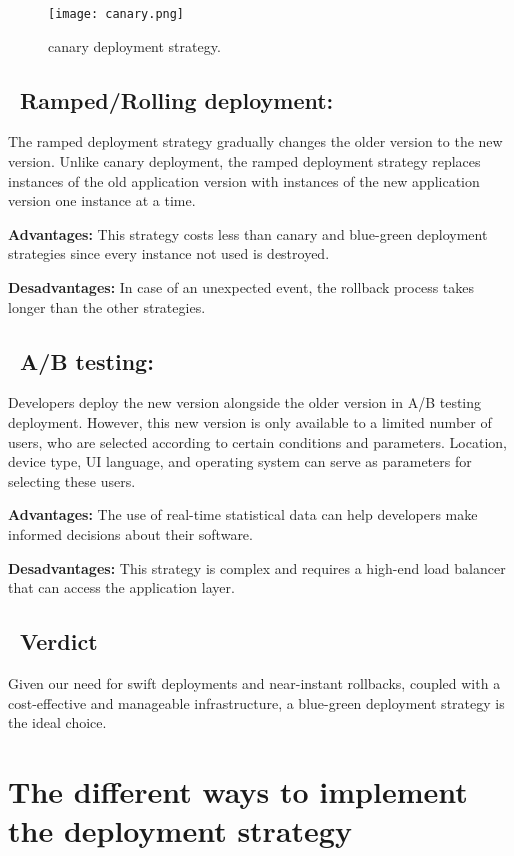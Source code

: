 \begin{figure}[htbp]
    \centering
    \texttt{[image: canary.png]}
    \caption{canary deployment strategy.}
    \label{fig:canary-deployment-strategy}
\end{figure}

\subsection*{ \textbullet\ Ramped/Rolling deployment:}
The ramped deployment strategy gradually changes the older version to the new version. Unlike canary deployment, the ramped deployment strategy replaces instances of the old application version with instances of the new application version one instance at a time.
\par \noindent \textbf{Advantages:} This strategy costs less than canary and blue-green deployment strategies since every instance not used is destroyed.
\par \noindent \textbf{Desadvantages:} In case of an unexpected event, the rollback process takes longer than the other strategies.

\subsection*{ \textbullet\ A/B testing:}
Developers deploy the new version alongside the older version in A/B testing deployment. However, this new version is only available to a limited number of users, who are selected according to certain conditions and parameters. Location, device type, UI language, and operating system can serve as parameters for selecting these users.
\par \noindent \textbf{Advantages:} The use of real-time statistical data can help developers make informed decisions about their software.
\par \noindent \textbf{Desadvantages:} This strategy is complex and requires a high-end load balancer that can access the application layer.

\subsection*{ \textbullet\ Verdict}
Given our need for swift deployments and near-instant rollbacks, coupled with a cost-effective and manageable infrastructure, a blue-green deployment strategy is the ideal choice.

\section{The different ways to implement the deployment strategy}
